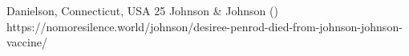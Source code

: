           {Danielson, Connecticut, USA}
          {25}
          {Johnson \& Johnson}
          {}
          {
             ()
          }
          {https://nomoresilence.world/johnson/desiree-penrod-died-from-johnson-johnson-vaccine/}


